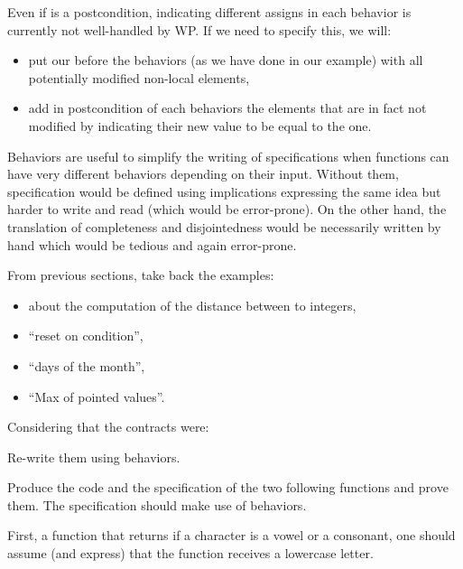 \begin{Warning}
  Even if  is a postcondition, indicating different assigns
  in each behavior is currently not well-handled by WP. If we need to specify
  this, we will:
  \begin{itemize}
  \item put our  before the behaviors (as we have done in our
    example) with all potentially modified non-local elements,
  \item add in postcondition of each behaviors the elements that are in fact
    not modified by indicating their new value to be equal to the
     one.
  \end{itemize}
\end{Warning}


Behaviors are useful to simplify the writing of specifications when
functions can have very different behaviors depending on their input.
Without them, specification would be defined using implications
expressing the same idea but harder to write and read (which would be
error-prone). On the other hand, the translation of completeness and
disjointedness would be necessarily written by hand which would be
tedious and again error-prone.






From previous sections, take back the examples:


\begin{itemize}
\item about the computation of the distance between to integers,
\item ``reset on condition'',
\item ``days of the month'',
\item ``Max of pointed values''.
\end{itemize}


Considering that the contracts were:




Re-write them using behaviors.




Produce the code and the specification of the two following functions
and prove them. The specification should make use of behaviors.


First, a function that returns if a character is a vowel or a consonant,
one should assume (and express) that the function receives a lowercase
letter.


